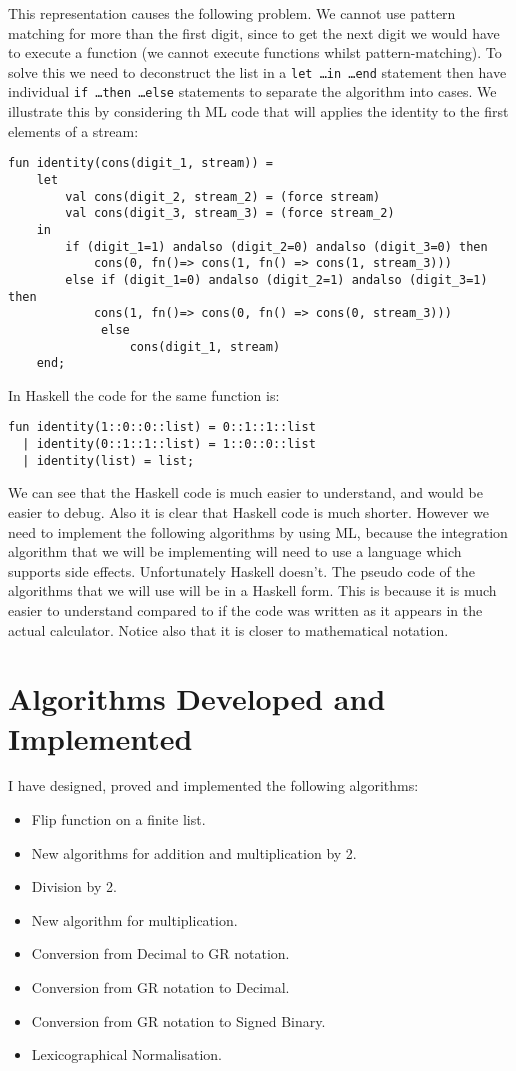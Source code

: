 \documentclass{cs4rep}
\begin{document}
This representation causes the following problem. We cannot use
pattern matching for more than the first digit, since to get the next
digit we would have to execute a function (we cannot execute functions
whilst pattern-matching). To solve this we need to deconstruct the
list in a {\tt let \ldots in \ldots end} statement then have
individual {\tt if \ldots then \ldots else} statements to separate the
algorithm into cases. We illustrate this by considering th ML code
that will applies the identity to the first elements of a stream:

\begin{verbatim}
fun identity(cons(digit_1, stream)) = 
    let
        val cons(digit_2, stream_2) = (force stream) 
        val cons(digit_3, stream_3) = (force stream_2) 
    in 
        if (digit_1=1) andalso (digit_2=0) andalso (digit_3=0) then 
            cons(0, fn()=> cons(1, fn() => cons(1, stream_3))) 
        else if (digit_1=0) andalso (digit_2=1) andalso (digit_3=1) then 
            cons(1, fn()=> cons(0, fn() => cons(0, stream_3))) 
             else 
                 cons(digit_1, stream)
    end;
\end{verbatim}

In Haskell the code for the same function is:

\begin{verbatim}
fun identity(1::0::0::list) = 0::1::1::list
  | identity(0::1::1::list) = 1::0::0::list 
  | identity(list) = list;
\end{verbatim}
We can see that the Haskell code is much easier to understand, and
would be easier to debug. Also it is clear that Haskell code is much
shorter. However we need to implement the following algorithms by
using ML, because the integration algorithm that we will be
implementing will need to use a language which supports side effects.
Unfortunately Haskell doesn't. The pseudo code of the algorithms that we
will use will be in a Haskell form. This is because it is much easier
to understand compared to if the code was written as it appears in the
actual calculator. Notice also that it is closer to mathematical notation.


\section{Algorithms Developed and Implemented}

I have designed, proved and implemented the following algorithms:
\begin{itemize}
\item Flip function on a finite list.
\item New algorithms for addition and multiplication by 2.
\item Division by 2.
\item New algorithm for multiplication.
\item Conversion from Decimal to GR notation.
\item Conversion from GR notation to Decimal.
\item Conversion from GR notation to Signed Binary.
\item Lexicographical Normalisation.
\end{itemize}
\end{document}

